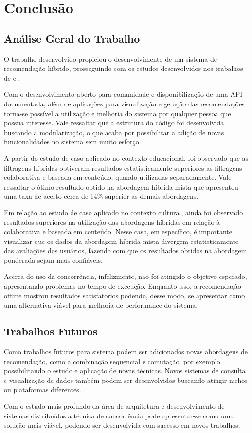 \chapter{\textbf{Conclusão}} %

\section{Análise Geral do Trabalho}

O trabalho desenvolvido propiciou o desenvolvimento de um sistema de recomendação híbrido, prosseguindo com os estudos desenvolvidos nos trabalhos de  e .

Com o desenvolvimento aberto para comunidade e disponibilização de uma API documentada, além de aplicações para visualização e geração das recomendações torna-se possível a utilização e melhoria do sistema por qualquer pessoa que possua interesse. Vale ressaltar que a estrutura do código foi desenvolvida buscando a modularização, o que acaba por possibilitar a adição de novas funcionalidades no sistema sem muito esforço.

A partir do estudo de caso aplicado no contexto educacional, foi observado que as filtragens híbridas obtiveram resultados estatisticamente superiores as filtragens colaborativa e baseada em conteúdo, quando utilizadas separadamente. Vale ressaltar o ótimo resultado obtido na abordagem híbrida mista que apresentou uma taxa de acerto cerca de 14\% superior as demais abordagens.

Em relação ao estudo de caso aplicado no contexto cultural, ainda foi observado resultados superiores na utilização das abordagens híbridas em relação à colaborativa e baseada em conteúdo. Nesse caso, em específico, é importante visualizar que os dados da abordagem híbrida mista divergem estatisticamente das avaliações dos usuários, fazendo com que os resultados obtidos na abordagem ponderada sejam mais confiáveis.

Acerca do uso da concorrência, infelizmente, não foi atingido o objetivo esperado, apresentando problemas no tempo de execução. Enquanto isso, a recomendação offline mostrou resultados satisfatórios podendo, desse modo, se apresentar como uma alternativa viável para melhoria de performance do sistema. 

\section{Trabalhos Futuros}

Como trabalhos futuros para sistema podem ser adicionados novas abordagens de recomendação, como a combinação sequencial e comutação, por exemplo, possibilitando o estudo e aplicação de novas técnicas. Novos sistemas de consulta e visualização de dados também podem ser desenvolvidos buscando atingir nichos ou plataformas diferentes.

Com o estudo mais profundo da área de arquitetura e desenvolvimento de sistemas distribuídos a técnica de concorrência pode apresentar-se como uma solução mais viável, podendo ser desenvolvida com sucesso em novos trabalhos.